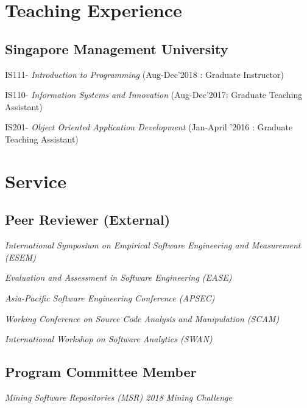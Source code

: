 \documentclass[12pt,letterpaper]{article}
\newcommand{\listitemspace}{0.15em}
\renewenvironment{itemize}
{\begin{list}{}{\setlength{\leftmargin}{0em}
				\setlength{\parskip}{0em}
				\setlength{\itemsep}{\listitemspace}
				\setlength{\parsep}{\listitemspace}}}
{\end{list}}
\begin{document}
\section*{Teaching Experience}

\subsection*{Singapore Management University}

\begin{itemize}
	
	\item IS111- \textit{Introduction to Programming} (Aug-Dec'2018 : Graduate Instructor)
	
	\item IS110- \textit{ Information Systems and Innovation} (Aug-Dec'2017: Graduate Teaching Assistant)
	
	\item IS201- \textit{Object Oriented Application Development} (Jan-April '2016 : Graduate Teaching Assistant)
	
\end{itemize}


\section*{Service}

\subsection*{Peer Reviewer (External)}

\begin{itemize}
	
	\item \textit{International Symposium on Empirical Software Engineering and Measurement (ESEM)}
	\item \textit{Evaluation and Assessment in Software Engineering (EASE)}
	\item  \textit{Asia-Pacific Software Engineering Conference (APSEC)}	
	\item  \textit{Working Conference on Source Code Analysis and Manipulation (SCAM)}		
	\item  \textit{International Workshop on Software Analytics (SWAN)}
	
	
\end{itemize}

\subsection*{Program Committee Member}
\begin{itemize}
	\item \textit{Mining Software Repositories (MSR) 2018 Mining Challenge}
\end{itemize}
\end{document}
